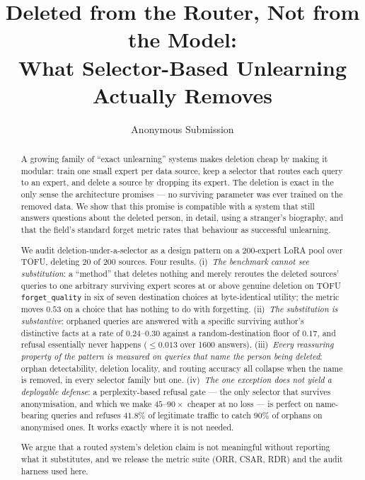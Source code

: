 \documentclass[11pt]{article}
\title{Deleted from the Router, Not from the Model:\\
       What Selector-Based Unlearning Actually Removes}
\author{Anonymous Submission}
\date{}
\newcommand{\csar}{CSAR}
\newcommand{\orr}{ORR}
\newcommand{\rdr}{RDR}
\newcommand{\fq}{\texttt{forget\_quality}}
\begin{document}
\maketitle

\begin{abstract}
A growing family of ``exact unlearning'' systems makes deletion cheap by making it modular: train
one small expert per data source, keep a selector that routes each query to an expert, and delete a
source by dropping its expert. The deletion is exact in the only sense the architecture promises ---
no surviving parameter was ever trained on the removed data. We show that this promise is
compatible with a system that still answers questions about the deleted person, in detail, using a
stranger's biography, and that the field's standard forget metric rates that behaviour as
successful unlearning.

We audit deletion-under-a-selector as a design pattern on a 200-expert LoRA pool over TOFU, deleting
20 of 200 sources. Four results. (i)~\emph{The benchmark cannot see substitution}: a ``method'' that
deletes nothing and merely reroutes the deleted sources' queries to one arbitrary surviving expert
scores at or above genuine deletion on TOFU \fq{} in six of seven destination choices at
byte-identical utility; the metric moves $0.53$ on a choice that has nothing to do with forgetting.
(ii)~\emph{The substitution is substantive}: orphaned queries are answered with a specific surviving
author's distinctive facts at a rate of $0.24$--$0.30$ against a random-destination floor of $0.17$,
and refusal essentially never happens ($\leq 0.013$ over 1600 answers). (iii)~\emph{Every reassuring
property of the pattern is measured on queries that name the person being deleted}: orphan
detectability, deletion locality, and routing accuracy all collapse when the name is removed, in
every selector family but one. (iv)~\emph{The one exception does not yield a deployable defense}: a
perplexity-based refusal gate --- the only selector that survives anonymisation, and which we make
$45$--$90\times$ cheaper at no loss --- is perfect on name-bearing queries and refuses $41.8\%$ of
legitimate traffic to catch $90\%$ of orphans on anonymised ones. It works exactly where it is not
needed.

We argue that a routed system's deletion claim is not meaningful without reporting what it
substitutes, and we release the metric suite (\orr{}, \csar{}, \rdr{}) and the audit harness used
here.
\end{abstract}
\end{document}
